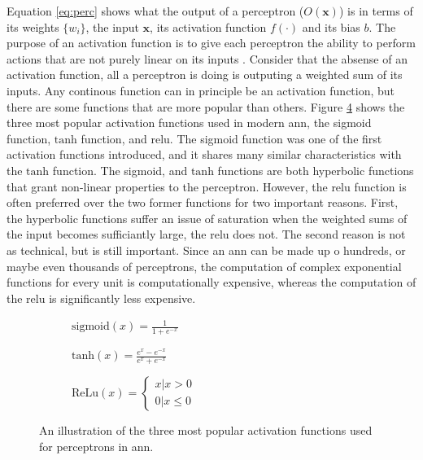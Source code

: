 Equation \eqref{eq:perc} shows what the output of a perceptron ($O(\mathbf{x})$) is in terms of its weights $\{w_i\}$, the input $\mathbf{x}$, its activation function $f(\cdot)$ and its bias $b$. The purpose of an activation function is to give each perceptron the ability to perform actions that are not purely linear on its inputs \cite{dl_book}. Consider that the absense of an activation function, all a perceptron is doing is outputing a weighted sum of its inputs. Any continous function can in principle be an activation function, but there are some functions that are more popular than others. Figure \ref{fig:obj_funcs} shows the three most popular activation functions used in modern \acrshort{ann}, the sigmoid function, $\mathrm{tanh}$ function, and \acrfull{relu}. The sigmoid function was one of the first activation functions introduced, and it shares many similar characteristics with the $\mathrm{tanh}$ function. The sigmoid, and $\mathrm{tanh}$ functions are both hyperbolic functions that grant non-linear properties to the perceptron. However, the \acrshort{relu} function is often preferred over the two former functions for two important reasons. First, the hyperbolic functions suffer an issue of saturation when the weighted sums of the input becomes sufficiantly large, the \acrshort{relu} does not. The second reason is not as technical, but is still important. Since an \acrshort{ann} can be made up o hundreds, or maybe even thousands of perceptrons, the computation of complex exponential functions for every unit is computationally expensive, whereas the computation of the \acrshort{relu} is significantly less expensive. 

\begin{figure}[H]
    \centering
    \begin{subfigure}[b]{0.32\textwidth}
        \centering
        
        \caption{$\mathrm{sigmoid}(x) = \frac{1}{1+e^{-x}}$}
        \label{fig:sigmoid}
    \end{subfigure}
    \begin{subfigure}[b]{0.32\textwidth}
        \centering
        
        \caption{$\mathrm{tanh}(x) = \frac{e^{x}-e^{-x}}{e^{x}+e^{-x}}$}
        \label{fig:tanh}
    \end{subfigure}
    \begin{subfigure}[b]{0.32\textwidth}
        \centering
        
        \caption{$\mathrm{ReLu}(x) = \left\{\begin{matrix}x | x>0\\ 0 | x \leq 0\end{matrix}\right.$}
        \label{fig:relu}
    \end{subfigure}
    \caption{An illustration of the three most popular activation functions used for perceptrons in \acrshort{ann}.}
    \label{fig:obj_funcs}
\end{figure}

